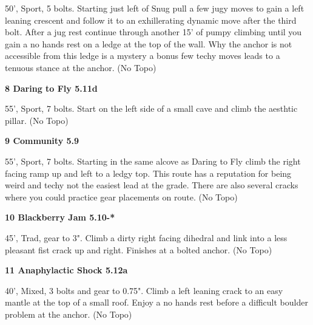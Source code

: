\begin{multicols}{2}
\begin{adjustwidth}{0.5cm}{}			
50', Sport, 5 bolts. Starting just left of Snug pull a few jugy moves to gain a left leaning crescent and follow it to an exhillerating dynamic move after the third bolt. After a jug rest continue through another 15' of pumpy climbing until you gain a no hands rest on a ledge at the top of the wall. Why the anchor is not accessible from this ledge is a mystery a bonus few techy moves leads to a tenuous stance at the anchor. (No Topo)
\end{adjustwidth}



\needspace{1.5cm}
\label{rt:Daring to Fly}
\colorbox{RoyalBlue!20}{
\parbox{0.95\linewidth}{
\textbf{
8 Daring to Fly 5.11d  
}}}

\begin{adjustwidth}{0.5cm}{}			
55', Sport, 7 bolts. Start on the left side of a small cave and climb the aesthtic pillar. (No Topo)
\end{adjustwidth}



\needspace{1.5cm}
\label{rt:Community}
\colorbox{green!20}{
\parbox{0.95\linewidth}{
\textbf{
9 Community 5.9  
}}}

\begin{adjustwidth}{0.5cm}{}			
55', Sport, 7 bolts. Starting in the same alcove as Daring to Fly climb the right facing ramp up and left to a ledgy top. This route has a reputation for being weird and techy not the easiest lead at the grade. There are also several cracks where you could practice gear placements on route. (No Topo)
\end{adjustwidth}



\needspace{1.5cm}
\label{rt:Blackberry Jam}
\colorbox{RoyalBlue!20}{
\parbox{0.95\linewidth}{
\textbf{
10 Blackberry Jam 5.10-*  
}}}

\begin{adjustwidth}{0.5cm}{}			
45', Trad, gear to 3". Climb a dirty right facing dihedral and link into a less pleasant fist crack up and right. Finishes at a bolted anchor. (No Topo)
\end{adjustwidth}



\needspace{1.5cm}
\label{rt:Anaphylactic Shock}
\colorbox{Goldenrod!50}{
\parbox{0.95\linewidth}{
\textbf{
11 Anaphylactic Shock 5.12a  
}}}

\begin{adjustwidth}{0.5cm}{}			
40', Mixed, 3 bolts and gear to 0.75". Climb a left leaning crack to an easy mantle at the top of a small roof. Enjoy a no hands rest before a difficult boulder problem at the anchor. (No Topo)
\end{adjustwidth}




\end{multicols}
